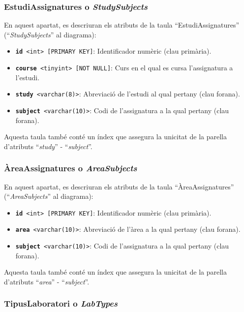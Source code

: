 \documentclass[a4paper,12pt]{ThesisStyle}
\begin{document}
\subsubsection{EstudiAssignatures o \textit{StudySubjects}}

En aquest apartat, es descriuran els atributs de la taula ``EstudiAssignatures'' (``\textit{StudySubjects}'' al diagrama):
\begin{itemize}
  \item \texttt{\textbf{id} <int> [PRIMARY KEY]}: Identificador numèric (clau primària).
  \item \texttt{\textbf{course} <tinyint> [NOT NULL]}: Curs en el qual es cursa l'assignatura a l'estudi.
  \item \texttt{\textbf{study} <varchar(8)>}: Abreviació de l'estudi al qual pertany (clau forana).
  \item \texttt{\textbf{subject} <varchar(10)>}: Codi de l'assignatura a la qual pertany (clau forana).
\end{itemize}

Aquesta taula també conté un índex que assegura la unicitat de la parella d'atributs ``\textit{study}'' - ``\textit{subject}''.

\subsubsection{ÀreaAssignatures o \textit{AreaSubjects}}

En aquest apartat, es descriuran els atributs de la taula ``ÀreaAssignatures'' (``\textit{AreaSubjects}'' al diagrama):
\begin{itemize}
  \item \texttt{\textbf{id} <int> [PRIMARY KEY]}: Identificador numèric (clau primària).
  \item \texttt{\textbf{area} <varchar(10)>}: Abreviació de l'àrea a la qual pertany (clau forana).
  \item \texttt{\textbf{subject} <varchar(10)>}: Codi de l'assignatura a la qual pertany (clau forana).
\end{itemize}

Aquesta taula també conté un índex que assegura la unicitat de la parella d'atributs ``\textit{area}'' - ``\textit{subject}''.

\subsubsection{TipusLaboratori o \textit{LabTypes}}
\end{document}
